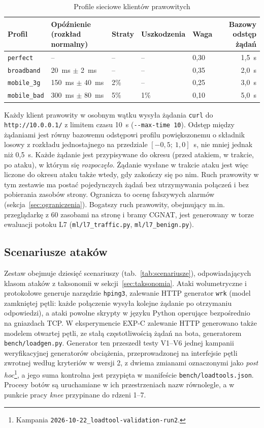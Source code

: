 \documentclass[a4paper,12pt]{article}
\begin{document}
\begin{table}[H]
\centering
\small
\caption{Profile sieciowe klientów prawowitych}\label{tab:profile}
\begin{tabularx}{\linewidth}{@{}lYlllr@{}}
\toprule
Profil & Opóźnienie (rozkład normalny) & Straty & Uszkodzenia & Waga & Bazowy odstęp żądań \\
\midrule
\texttt{perfect} & -- & -- & -- & 0,30 & 1,5~s \\
\texttt{broadband} & 20~ms $\pm$ 2~ms & -- & -- & 0,35 & 2,0~s \\
\texttt{mobile\_3g} & 150~ms $\pm$ 40~ms & 2\% & -- & 0,25 & 3,0~s \\
\texttt{mobile\_bad} & 300~ms $\pm$ 80~ms & 5\% & 1\% & 0,10 & 5,0~s \\
\bottomrule
\end{tabularx}
\end{table}

Każdy klient prawowity w osobnym wątku wysyła żądania \texttt{curl} do \texttt{http://10.0.0.1/} z limitem czasu 10~s (\texttt{-{}-max-time 10}). Odstęp między żądaniami jest równy bazowemu odstępowi profilu powiększonemu o składnik losowy z rozkładu jednostajnego na przedziale $[-0{,}5;\ 1{,}0]$~s, nie mniej jednak niż 0,5~s. Każde żądanie jest przypisywane do okresu (przed atakiem, w trakcie, po ataku), w którym się \emph{rozpoczęło}. Żądanie wysłane w trakcie ataku jest więc liczone do okresu ataku także wtedy, gdy zakończy się po nim. Ruch prawowity w tym zestawie ma postać pojedynczych żądań bez utrzymywania połączeń i bez pobierania zasobów strony. Ogranicza to ocenę fałszywych alarmów (sekcja~\ref{sec:ograniczenia}). Bogatszy ruch prawowity, obejmujący m.in. przeglądarkę z 60 zasobami na stronę i bramy CGNAT, jest generowany w torze ewaluacji potoku L7 (\texttt{ml/l7\_traffic.py}, \texttt{ml/l7\_benign.py}).

\subsection{Scenariusze ataków}\label{sec:scenariusze}
Zestaw obejmuje dziesięć scenariuszy (tab.~\ref{tab:scenariusze}), odpowiadających klasom ataków z taksonomii w sekcji~\ref{sec:taksonomia}. Ataki wolumetryczne i protokołowe generuje narzędzie \texttt{hping3}, zalewanie HTTP generator \texttt{wrk} (model zamkniętej pętli: każde połączenie wysyła kolejne żądanie po otrzymaniu odpowiedzi), a ataki powolne skrypty w języku Python operujące bezpośrednio na gniazdach TCP. W eksperymencie EXP-C zalewanie HTTP generowano także modelem otwartej pętli, ze stałą częstotliwością żądań na bota, generatorem \texttt{bench/loadgen.py}. Generator ten przeszedł testy V1--V6 jednej kampanii weryfikacyjnej generatorów obciążenia, przeprowadzonej na interfejsie pętli zwrotnej według kryteriów w wersji 2, z dwiema zmianami oznaczonymi jako \textit{post hoc}\footnote{\raggedright Kampania \texttt{2026-10-22\_loadtool-validation-run2}.}, a jego suma kontrolna jest przypięta w manifeście \texttt{bench/loadtools.json}. Procesy botów są uruchamiane w ich przestrzeniach nazw równolegle, a w punkcie pracy \textit{knee} przypinane do rdzeni 1--7.
\end{document}
